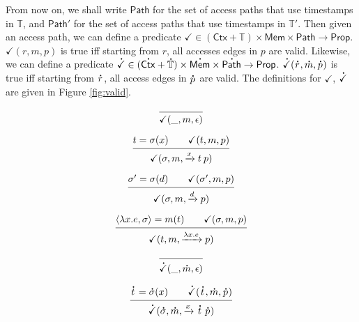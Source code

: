\documentclass[acmsmall,screen,review]{acmart}\settopmatter{printfolios=true,printccs=false,printacmref=false}
\theoremstyle{acmdefinition}
\newcommand*{\A}[1]{\overset{\,_{\mbox{\Large .}}}{#1}}
\newcommand*{\modid}{d}
\newcommand*{\Time}{\mathbb{T}}
\newcommand*{\ctx}{\sigma}
\newcommand*{\Ctx}{\mathsf{Ctx}}
\newcommand*{\Mem}{\mathsf{Mem}}
\newcommand*{\mem}{m}
\newcommand*{\valid}{\checkmark}
\newcommand*{\Path}{\mathsf{Path}}
\begin{document}
From now on, we shall write $\Path$ for the set of access paths that use timestamps in $\Time$, and $\Path'$ for the set of access paths that use timestamps in $\Time'$.
Then given an access path, we can define a predicate $\valid\in(\Ctx+\Time)\times\Mem\times\Path\rightarrow\mathsf{Prop}$.
$\valid(r,\mem,p)$ is true iff starting from $r$, all accesses edges in $p$ are valid.
Likewise, we can define a predicate $\A\valid\in(\A\Ctx+\A\Time)\times\A\Mem\times\A\Path\rightarrow\mathsf{Prop}$.
$\A\valid(\A{r},\A\mem,\A{p})$ is true iff starting from $\A{r}$, all access edges in $\A{p}$ are valid.
The definitions for $\valid$, $\A\valid$ are given in Figure \ref{fig:valid}.
\begin{figure}[t!]
  \centering
  \begin{minipage}{0.4\linewidth}
    \footnotesize
    \[
      \begin{prooftree}
        \infer0{\valid(\_,\mem,\epsilon)}
      \end{prooftree}
    \]

    \[
      \begin{prooftree}
        \hypo{t=\ctx(x)\qquad\valid(t,\mem,p)}
        \infer1{\valid(\ctx,\mem,\xrightarrow{x}t\:p)}
      \end{prooftree}
    \]

    \[
      \begin{prooftree}
        \hypo{\ctx'=\ctx(\modid)\qquad\valid(\ctx',\mem,p)}
        \infer1{\valid(\ctx,\mem,\xrightarrow{\modid}p)}
      \end{prooftree}
    \]

    \[
      \begin{prooftree}
        \hypo{\langle\lambda x.e,{\ctx}\rangle=\mem(t)\qquad\valid(\ctx,\mem,p)}
        \infer1{\valid(t,\mem,\xrightarrow{\lambda x.e}p)}
      \end{prooftree}
    \]
  \end{minipage}
  \begin{minipage}{0.4\linewidth}
    \footnotesize
    \[
      \begin{prooftree}
        \infer0{\A\valid(\_,\A\mem,\epsilon)}
      \end{prooftree}
    \]

    \[
      \begin{prooftree}
        \hypo{\A{t}=\A\ctx(x)\qquad\A\valid(\A{t},\A\mem,\A{p})}
        \infer1{\A\valid(\A\ctx,\A\mem,\xrightarrow{x}\A{t}\:\A{p})}
      \end{prooftree}
    \]


\end{minipage}
\end{figure}
\end{document}
